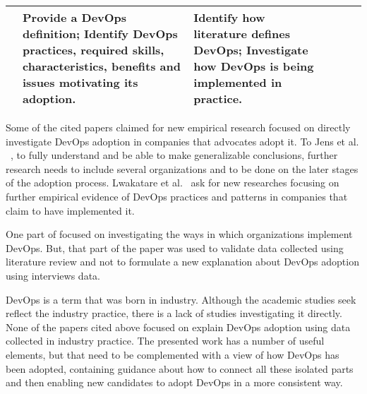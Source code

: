 \begin{table*}[t]
\begin{tabular}{|p{1.4cm}|p{2.72cm}|p{2.72cm}|p{2.72cm}|p{2.72cm}|p{2.72cm}|}
&
Provide a DevOps definition;
\newline \newline
Identify DevOps practices, required skills, characteristics, benefits and
issues motivating its adoption.

&
Identify how literature defines DevOps;
\newline \newline
Investigate how DevOps is being implemented in practice.\\ \bottomrule

\end{tabular}
\end{table*}

Some of the cited papers claimed for new empirical research focused on directly
investigate DevOps adoption in companies that advocates adopt it. To Jens et al.
~\cite{devops_a_definition_xp_15}, to fully understand and be able to make
generalizable conclusions, further research needs to include several
organizations and to be done on the later stages of the adoption process.
Lwakatare et al.~\cite{extending_dimensions_icsea_16} ask for new researches
focusing on further empirical evidence of DevOps practices and patterns in
companies that claim to have implemented it.

One part of \cite{qualitative_devops_journalsw_17} focused on investigating the
ways in which organizations implement DevOps. But, that part of the paper was
used to validate data collected using literature review and not to formulate
a new explanation about DevOps adoption using interviews data.

DevOps is a term that was born in industry. Although the academic studies seek
reflect the industry practice, there is a lack of studies investigating it
directly. None of the papers cited above focused on explain DevOps adoption
using data collected in industry practice. The presented work has a number of
useful elements, but that need to be complemented with a view of how DevOps has
been adopted, containing guidance about how to connect all these isolated parts
and then enabling new candidates to adopt DevOps in a more consistent way.
